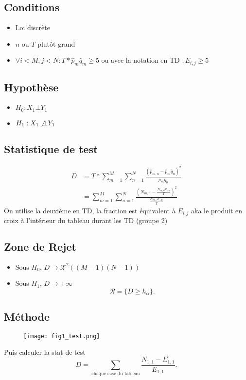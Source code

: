 \documentclass{article}
\theoremstyle{plain}%
\theoremstyle{definition}
\theoremstyle{remark}
\begin{document}
\subsection*{Conditions}
    \begin{itemize}
        \item Loi discrète 
        \item $ n $ ou $ T $  plutôt grand
        \item $ \forall i < M, j < N : T*\hat{p}_m \hat{q}_m \geq 5 $ ou avec la notation en TD $ :E_{i,j} \geq 5 $ 
    \end{itemize}

\subsection*{Hypothèse}
    \begin{itemize}
        \item $ H_0: X_1 \bot Y_1 $
        \item $ H_1: X_1 \not\bot Y_1 $
    \end{itemize}

\subsection*{Statistique de test}
    \begin{align*}
        D &= T * \sum_{m=1}^{M}\sum_{n=1}^{N}\frac{(\hat{p}_{m,n} - \hat{p}_m \hat{q}_n)^2}{\hat{p}_m \hat{q}_n} \\
            &= \sum_{m=1}^{M}\sum_{n=1}^{N}\frac{( N_{m,n} - \frac{N_{m, \centerdot} N_{\centerdot, n}}{T})^2}{\frac{N_{m, \centerdot} N_{\centerdot, n}}{T}}
    \end{align*}
    On utilise la deuxième en TD, la fraction est équivalent à $ E_{i,j} $ aka le produit en croix à l'intérieur du tableau durant les TD (groupe 2)

\subsection*{Zone de Rejet}
\begin{itemize}
    \item Sous $ H_0 $, $ D \to \mathcal{X}^2 ((M-1)(N-1))  $
    \item Sous $ H_1 $, $ D \to +\infty  $
    \[
        \mathcal{R} = \{D \geq h_\alpha \}
    .\]
\end{itemize}

\subsection*{Méthode}
\begin{figure}[!h]
    \centering
    \texttt{[image: fig1\_test.png]}
\end{figure}
Puis calculer la stat de test 
\[
    D = \sum_{\text{chaque case du tableau}}\frac{N_{1,1}- E_{1,1}}{E_{1,1}}
.\]
\end{document}
